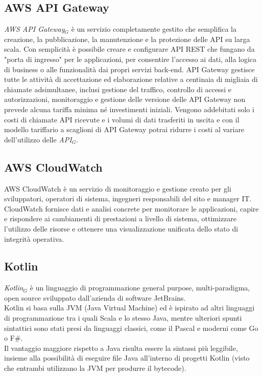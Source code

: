 \subsection{AWS API Gateway}
\textit{AWS API Gateway$_{G}$} è un servizio completamente gestito che semplifica la creazione, la pubblicazione, la manutenzione e la protezione delle API su larga scala. Con semplicità è possibile creare e configurare API REST che fungano da "porta di ingresso" per le applicazioni, per consentire l'accesso ai dati, alla logica di business o alle funzionalità dai propri servizi back-end. API Gateway gestisce tutte le attività di accettazione ed elaborazione relative a centinaia di migliaia di chiamate adsimultanee, inclusi gestione del traffico, controllo di accessi e autorizzazioni, monitoraggio e gestione delle versione delle API Gateway non prevede alcuna tariffa minima né investimenti iniziali. Vengono addebitati solo i costi di chiamate API ricevute e i volumi di dati trasferiti in uscita e con il modello tariffario a scaglioni di API Gateway potrai ridurre i costi al variare dell'utilizzo delle \textit{API$_{G}$}.
\subsection{AWS CloudWatch}
AWS CloudWatch è un servizio di monitoraggio e gestione creato per gli sviluppatori, operatori di sistema, ingegneri responsabili del sito e manager IT. CloudWatch fornisce dati e analisi concrete per monitorare le applicazioni, capire e rispondere ai cambiamenti di prestazioni a livello di sistema, ottimizzare l'utilizzo delle risorse e ottenere una visualizzazione unificata dello stato di integrità operativa. 
\subsection{Kotlin}
\textit{Kotlin$_{G}$} è un linguaggio di programmazione general purpose, multi-paradigma, open source sviluppato dall'azienda di software JetBrains.\\
Kotlin si basa sulla JVM (Java Virtual Machine) ed è ispirato ad altri linguaggi di programmazione tra i quali Scala e lo stesso Java, mentre ulteriori spunti sintattici sono stati presi da linguaggi classici, come il Pascal e moderni come Go o F\#.\\
Il vantaggio maggiore rispetto a Java risulta essere la sintassi più leggibile, insieme alla possibilità di eseguire file Java all'interno di progetti Kotlin (visto che entrambi utilizzano la JVM per produrre il bytecode).

